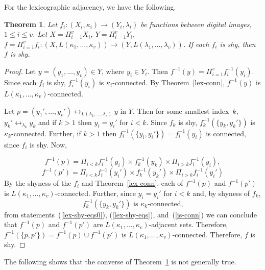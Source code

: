 \documentclass{article}
\theoremstyle{plain}
\newtheorem{thm}{Theorem}
\theoremstyle{definition}
\numberwithin{thm}{section}
\newcommand{\adj}{\leftrightarrow}
\begin{document}
For the lexicographic adjacency,
we have the following.

\begin{thm}
\label{lex-shy-prod}
Let $f_i: (X_i,\kappa_i) \to (Y_i,\lambda_i)$ be functions 
between digital images, $1 \le i \le v$. Let $X = \Pi_{i=1}^v X_i$,
$Y= \Pi_{i=1}^v Y_i$,
$f=\Pi_{i=1}^v f_i: (X,L(\kappa_1,\ldots,\kappa_v)) \to (Y,L(\lambda_1,\ldots,\lambda_v))$.
If each $f_i$ is shy, then $f$ is
shy.
\end{thm}

\begin{proof}
Let $y=(y_1,\ldots,y_v) \in Y$,
where $y_i \in Y_i$. Then
$f^{-1}(y)=\Pi_{i=1}^v f_i^{-1}(y_i)$. Since each $f_i$ is shy,
$f_i^{-1}(y_i)$ is $\kappa_i$-connected. By Theorem~\ref{lex-conn}, $f^{-1}(y)$ 
is $L(\kappa_1,\ldots,\kappa_v)$-connected.

Let $p=(y_1',\ldots,y_v') \adj_{L(\lambda_1,\ldots,\lambda_v)} y$ in $Y$. Then for
some smallest index~$k$, $y_k' \adj_{\lambda_k} y_k$ and if $k>1$ then $y_i=y_i'$ for $i<k$. Since
$f_k$ is shy, $f_k^{-1}(\{y_k,y_k'\})$ is $\kappa_k$-connected. Further, if
$k>1$ then $f_i^{-1}(\{y_i,y_i'\})=f_i^{-1}(y_i)$ is connected,
since $f_i$ is shy. Now,

\begin{equation}
\label{lex-shy-eqs0}
f^{-1}(p)= \Pi_{i<k}f_i^{-1}(y_i) \times f_k^{-1}(y_k) \times \Pi_{i>k}f_i^{-1}(y_i), 
\end{equation}
\begin{equation}
\label{lex-shy-eqs}
f^{-1}(p')= \Pi_{i<k}f_i^{-1}(y_i') \times f_k^{-1}(y_k') \times \Pi_{i>k}f_i^{-1}(y_i')
\end{equation}
By the shyness of the $f_i$ and Theorem~\ref{lex-conn}, each of
$f^{-1}(p)$ and $f^{-1}(p')$ is $L(\kappa_1,\ldots,\kappa_v)$-connected. Further,
since $y_i=y_i'$ for $i<k$ and, by shyness of $f_k$,
\begin{equation}
\label{is-conn}
f_k^{-1}(\{y_k,y_k'\}) \mbox{ is } \kappa_k\mbox{-connected,}
\end{equation}
from statements~(\ref{lex-shy-eqs0}), (\ref{lex-shy-eqs}), and~(\ref{is-conn})
we can conclude that
$f^{-1}(p)$ and $f^{-1}(p')$ are $L(\kappa_1,\ldots,\kappa_v)$-adjacent sets. Therefore,
$f^{-1}(\{p,p'\})=f^{-1}(p)\cup f^{-1}(p')$ is
$L(\kappa_1,\ldots,\kappa_v)$-connected.
Therefore, $f$ is shy.
\end{proof}

The following shows that the
converse of Theorem~\ref{lex-shy-prod} is not generally true.
\end{document}
